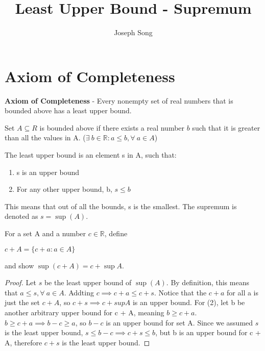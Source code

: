 \documentclass{article}
\title{Least Upper Bound - Supremum}
\author{Joseph Song}
\date{}
\begin{document}
\maketitle

\section{Axiom of Completeness}
\textbf{Axiom of Completeness} - Every nonempty set of real numbers that is bounded above has a least upper bound.
\begin{definition}
    Set $A \subseteq R$ is bounded above if there exists a real number $b$ such that it is greater than all the values in A. ($\exists\ b \in \mathbb{R}: a \leq b, \forall\ a\in A$)
\end{definition}

\begin{definition}
    The least upper bound is an element s in A, such that:
    \begin{enumerate}
        \item s is an upper bound
        \item For any other upper bound, b, $s \leq b$
    \end{enumerate}
    This means that out of all the bounds, s is the smallest. The supremum is denoted as $s = \operatorname{sup}(A)$.
\end{definition}

\begin{example}
    For a set A and a number $c \in \mathbb{R}$, define
    \begin{center}
        $c + A = \{c + a : a \in A\}$
    \end{center}
    and show $\operatorname{sup}(c+A) = c+\operatorname{sup}A$.
\end{example}
\begin{proof}

    Let $s$ be the least upper bound of $\operatorname{sup}(A)$. By definition, this means that $a \leq s, \forall\ a \in A$. Addting $c \implies c +a \leq c + s$. Notice that the $c + a$ for all a is just the set $c + A$, so $c + s \implies c+ supA$ is an upper bound. For (2), let b be another arbitrary upper bound for c + A, meaning $b \geq c + a$. $b \geq c + a \implies b - c \geq a$, so $b - c$ is an upper bound for set A. Since we assumed $s$ is the least upper bound, $s \leq b - c \implies c + s \leq b$, but b is an upper bound for c + A, therefore $c + s$ is the least upper bound.
    
\end{proof}
\end{document}
